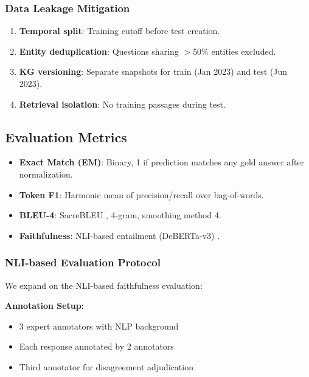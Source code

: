 \documentclass[10pt,twocolumn]{article}
\begin{document}
\subsubsection{Data Leakage Mitigation}
\label{sec:leakage}
\begin{enumerate}
    \item \textbf{Temporal split}: Training cutoff before test creation.
    \item \textbf{Entity deduplication}: Questions sharing $>$50\% entities excluded.
    \item \textbf{KG versioning}: Separate snapshots for train (Jan 2023) and test (Jun 2023).
    \item \textbf{Retrieval isolation}: No training passages during test.
\end{enumerate}

\subsection{Evaluation Metrics}

\begin{itemize}
    \item \textbf{Exact Match (EM)}: Binary, 1 if prediction matches any gold answer after normalization.
    \item \textbf{Token F1}: Harmonic mean of precision/recall over bag-of-words.
    \item \textbf{BLEU-4}: SacreBLEU \cite{post2018sacrebleu}, 4-gram, smoothing method 4.
    \item \textbf{Faithfulness}: NLI-based entailment (DeBERTa-v3) \cite{he2021deberta}.
\end{itemize}


\subsubsection{NLI-based Evaluation Protocol}
\label{sec:nli_protocol}

We expand on the NLI-based faithfulness evaluation:

\textbf{Annotation Setup:}
\begin{itemize}
    \item 3 expert annotators with NLP background
    \item Each response annotated by 2 annotators
    \item Third annotator for disagreement adjudication
\end{itemize}
\end{document}
